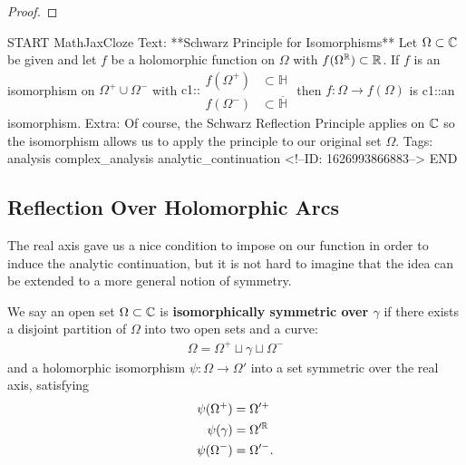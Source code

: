 \documentclass{memoir}
\begin{document}
\begin{proof}
	
\end{proof}

\begin{anki}
START
MathJaxCloze
Text: **Schwarz Principle for Isomorphisms** 
Let \(\Omega \subset \mathbb{C}\) be given and let \(f\) be a holomorphic function on \(\Omega \) with \(f(\Omega^{\mathbb{R}}) \subset \mathbb{R}\).
If \(f\) is an isomorphism on \(\Omega^{+}\cup \Omega^{-}\) with
{{c1::\(\begin{align*}
		f(\Omega^{+}) &\subset \mathbb{H}\\
		f(\Omega^{-}) &\subset \overline{\mathbb{H}}
	\end{align*}\)}}
	then \(f:\Omega \to f(\Omega )\) is {{c1::an isomorphism}}.
Extra: Of course, the Schwarz Reflection Principle applies on \(\mathbb{C}\) so the isomorphism allows us to apply the principle to our original set \(\Omega \).
Tags: analysis complex_analysis analytic_continuation
<!--ID: 1626993866883-->
END
\end{anki}


\subsection{Reflection Over Holomorphic Arcs}
\label{sub:reflection_over_Holomorphic_arcs}

The real axis gave us a nice condition to impose on our function in order to induce the analytic continuation, but it is not hard to imagine that the idea can be extended to a more general notion of symmetry.

\begin{defn}
	We say an open set \(\Omega\subset \mathbb{C} \) is \textbf{isomorphically symmetric over \(\gamma \)} if there exists a disjoint partition of \(\Omega \) into two open sets and a curve:
	\begin{align*}
		\Omega = \Omega^{+} \sqcup \gamma \sqcup \Omega^{-}
	\end{align*}
	and a holomorphic isomorphism \(\psi:\Omega \to \Omega'\) into a set symmetric over the real axis, satisfying
	\begin{align*}
		\psi (\Omega^{+}) &= \Omega'^{+}\\
		\psi(\gamma ) &= \Omega'^{\mathbb{R}}\\
		\psi (\Omega^{-}) &= \Omega'^{-}.
	\end{align*}
\end{defn}
\end{document}
